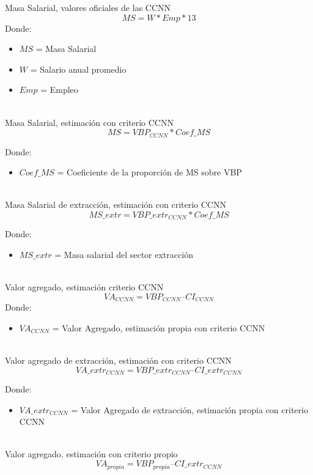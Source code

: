 \documentclass[letterpaper,11pt, spanish]{scrartcl}
\begin{document}
\begin{itemize}
Masa Salarial, valores oficiales de las CCNN
$$MS = W * Emp * 13$$
Donde: 
\begin{itemize}
\item $MS$ = Masa Salarial 
\item $W$ =  Salario anual promedio
\item $Emp$ = Empleo\\ \\
\end{itemize}


Masa Salarial, estimación con criterio CCNN
$$MS =  VBP_{CCNN} *  Coef\_MS$$

Donde: 
\begin{itemize}
\item $Coef\_MS$ = Coeficiente de la proporción de MS sobre VBP\\ \\
\end{itemize}


Masa Salarial de extracción, estimación con criterio CCNN
$$MS\_extr =  VBP\_extr_{CCNN} *  Coef\_MS$$

Donde: 
\begin{itemize}
\item $MS\_extr$ = Masa salarial del sector extracción\\ \\
\end{itemize}


Valor agregado, estimación criterio CCNN
$$VA_{CCNN}  = VBP_{CCNN} – CI_{CCNN} $$
Donde:
\begin{itemize}
\item $VA_{CCNN}$ = Valor Agregado, estimación propia con criterio CCNN\\ \\
\end{itemize}



Valor agregado de extracción, estimación con criterio CCNN
$$VA\_extr_{CCNN}  = VBP\_extr_{CCNN} – CI\_extr_{CCNN} $$

Donde:
\begin{itemize}
\item $VA\_extr_{CCNN}$ = Valor Agregado de extracción, estimación propia con criterio CCNN \\ \\
\end{itemize}

Valor agregado, estimación con criterio propio
$$VA_{propia}  = VBP_{propia} – CI\_extr_{CCNN} $$


\end{itemize}
\end{document}
